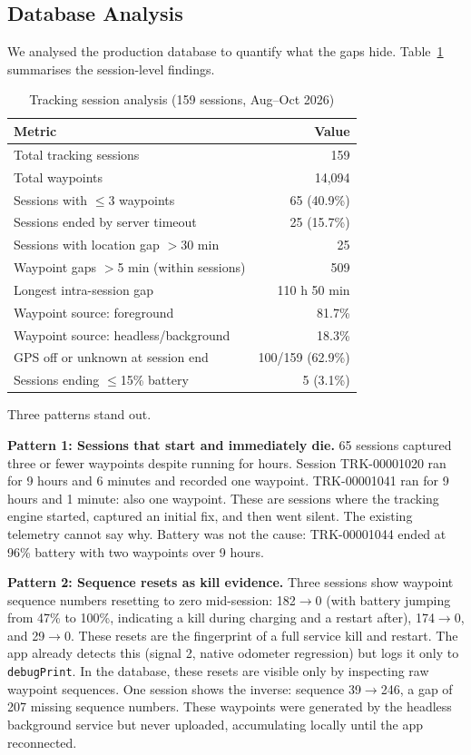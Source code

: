 \documentclass[10pt,journal,compsoc]{IEEEtran}
\begin{document}
\subsection{Database Analysis}
\label{sec:database}

We analysed the production database to quantify what the gaps hide.
Table~\ref{tab:sessions} summarises the session-level findings.

\begin{table}[h]
\caption{Tracking session analysis (159 sessions, Aug--Oct 2026)}
\label{tab:sessions}
\small
\begin{tabular}{@{}lr@{}}
\toprule
Metric & Value \\
\midrule
Total tracking sessions & 159 \\
Total waypoints & 14,094 \\
Sessions with $\leq$3 waypoints & 65 (40.9\%) \\
Sessions ended by server timeout & 25 (15.7\%) \\
Sessions with location gap $>$30 min & 25 \\
Waypoint gaps $>$5 min (within sessions) & 509 \\
Longest intra-session gap & 110 h 50 min \\
Waypoint source: foreground & 81.7\% \\
Waypoint source: headless/background & 18.3\% \\
GPS off or unknown at session end & 100/159 (62.9\%) \\
Sessions ending $\leq$15\% battery & 5 (3.1\%) \\
\bottomrule
\end{tabular}
\end{table}

Three patterns stand out.

\textbf{Pattern 1: Sessions that start and immediately die.}
65 sessions captured three or fewer waypoints despite running for hours.
Session TRK-00001020 ran for 9 hours and 6 minutes and recorded one
waypoint. TRK-00001041 ran for 9 hours and 1 minute: also one waypoint.
These are sessions where the tracking engine started, captured an initial
fix, and then went silent. The existing telemetry cannot say why. Battery
was not the cause: TRK-00001044 ended at 96\% battery with two waypoints
over 9 hours.

\textbf{Pattern 2: Sequence resets as kill evidence.}
Three sessions show waypoint sequence numbers resetting to zero
mid-session: 182$\to$0 (with battery jumping from 47\% to 100\%,
indicating a kill during charging and a restart after), 174$\to$0, and
29$\to$0. These resets are the fingerprint of a full service kill and
restart. The app already detects this (signal 2, native odometer
regression) but logs it only to \texttt{debugPrint}. In the database,
these resets are visible only by inspecting raw waypoint sequences. One
session shows the inverse: sequence 39$\to$246, a gap of 207 missing
sequence numbers. These waypoints were generated by the headless
background service but never uploaded, accumulating locally until the app
reconnected.
\end{document}
